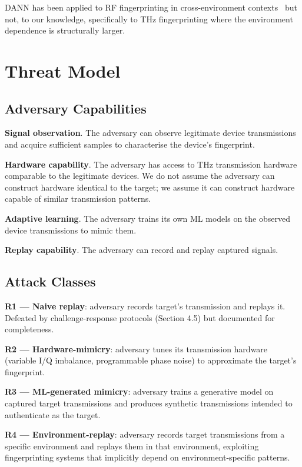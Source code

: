 \documentclass[sigconf,nonacm]{acmart}
\begin{document}
DANN has been applied to RF fingerprinting in cross-environment
contexts~\cite{xie2021unsupervisedrff} but not, to our knowledge,
specifically to THz fingerprinting where the environment dependence
is structurally larger.

\section{Threat Model}

\subsection{Adversary Capabilities}

\textbf{Signal observation}. The adversary can observe legitimate
device transmissions and acquire sufficient samples to characterise
the device's fingerprint.

\textbf{Hardware capability}. The adversary has access to THz
transmission hardware comparable to the legitimate devices. We
do not assume the adversary can construct hardware identical to
the target; we assume it can construct hardware capable of similar
transmission patterns.

\textbf{Adaptive learning}. The adversary trains its own ML models
on the observed device transmissions to mimic them.

\textbf{Replay capability}. The adversary can record and replay
captured signals.

\subsection{Attack Classes}

\textbf{R1 --- Naive replay}: adversary records target's
transmission and replays it. Defeated by challenge-response
protocols (Section 4.5) but documented for completeness.

\textbf{R2 --- Hardware-mimicry}: adversary tunes its
transmission hardware (variable I/Q imbalance, programmable
phase noise) to approximate the target's fingerprint.

\textbf{R3 --- ML-generated mimicry}: adversary trains a
generative model on captured target transmissions and produces
synthetic transmissions intended to authenticate as the target.

\textbf{R4 --- Environment-replay}: adversary records target
transmissions from a specific environment and replays them in
that environment, exploiting fingerprinting systems that
implicitly depend on environment-specific patterns.
\end{document}
